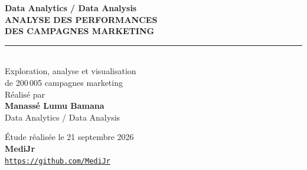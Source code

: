 \begin{titlepage}
{

    \begin{center}
        \vspace*{2.1cm}

        {\large \textcolor{textcolor}{\textbf{Data Analytics / Data Analysis}}}\\[1.35cm]

        {\Huge \textcolor{primarycolor}{\textbf{ANALYSE DES PERFORMANCES}}}\\[0.28cm]
        {\Huge \textcolor{primarycolor}{\textbf{DES CAMPAGNES MARKETING}}}\\[0.75cm]

        \textcolor{primarycolor}{\rule{0.62\linewidth}{0.5mm}}\\[0.7cm]

        {\large \textcolor{secondarycolor}{Exploration, analyse et visualisation}}\\[0.12cm]
        {\large \textcolor{secondarycolor}{de 200\,005 campagnes marketing}}\\[1.6cm]

        {\large \textcolor{textcolor}{Réalisé par}}\\[0.4cm]
        {\LARGE \textcolor{primarycolor}{\textbf{Manassé Lumu Bamana}}}\\[0.45cm]
        {\large \textcolor{graycolor}{Data Analytics / Data Analysis}}

        \vfill

        {\normalsize \textcolor{textcolor}{Étude réalisée le 21 septembre 2026}}\\[0.85cm]

        {\large \textcolor{textcolor}{\textbf{MediJr}}}\\[0.22cm]
        {\large \href{https://github.com/MediJr}{\textcolor{primarycolor}{\texttt{https://github.com/MediJr}}}}

        \vspace*{1.55cm}
    \end{center}

    } %
    \restoregeometry
\end{titlepage}
